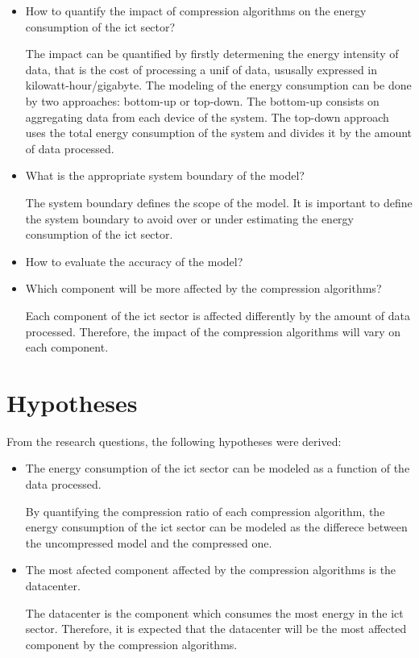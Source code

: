 \begin{itemize}
    \item How to quantify the impact of compression algorithms on the energy consumption of the \ac{ict} sector?

    The impact can be quantified by firstly determening the energy intensity of data, that is the cost of processing a unif of data, ususally expressed in \ac{kilowatt-hour}/\ac{gigabyte}.
    The modeling of the energy consumption can be done by two approaches: bottom-up or top-down. 
    The bottom-up consists on aggregating data from each device of the system.
    The top-down approach uses the total energy consumption of the system and divides it by the amount of data processed.
    
    \item What is the appropriate system boundary of the model?
    
    The system boundary defines the scope of the model. It is important to define the system boundary to avoid over or under estimating the energy consumption of the \ac{ict} sector.

    \item How to evaluate the accuracy of the model?

    
    \item Which component will be more affected by the compression algorithms?

    Each component of the \ac{ict} sector is affected differently by the amount of data processed. Therefore, the impact of the compression algorithms will vary on each component.
\end{itemize}

\section{Hypotheses}
\label{section:hypotheses}

From the research questions, the following hypotheses were derived:

\begin{itemize}
    \item The energy consumption of the \ac{ict} sector can be modeled as a function of the data processed.

    By quantifying the compression ratio of each compression algorithm, the energy consumption of the \ac{ict} sector can be modeled as the differece between the uncompressed model and the compressed one.

    \item The most afected component affected by the compression algorithms is the datacenter.

    The datacenter is the component which consumes the most energy in the \ac{ict} sector. Therefore, it is expected that the datacenter will be the most affected component by the compression algorithms.

\end{itemize}


